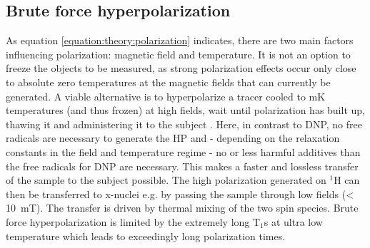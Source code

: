         \subsection{Brute force hyperpolarization}
        As equation \ref{equation:theory:polarization} indicates, there are two main factors influencing polarization: magnetic field and temperature. It is not an option to freeze the objects to be measured, as strong polarization effects occur only close to absolute zero temperatures at the magnetic fields that can currently be generated. A viable alternative is to hyperpolarize a tracer cooled to \si{\milli\kelvin} temperatures (and thus frozen) at high fields, wait until polarization has built up, thawing it and administering it to the subject \cite{hirsch_brute-force_2015}. Here, in contrast to DNP, no free radicals are necessary to generate the HP and - depending on the relaxation constants in the field and temperature regime - no or less harmful additives than the free radicals for DNP are necessary. This makes a faster and lossless transfer of the sample to the subject possible. The high polarization generated on $^{1}$H can then be transferred to x-nuclei e.g. by passing the sample through low fields (< \SI{10}{\milli\tesla}). The transfer is driven by thermal mixing \cite{goldman_overview_2008} of the two spin species. Brute force hyperpolarization is limited by the extremely long T$_1$s at ultra low temperature which leads to exceedingly long polarization times.

